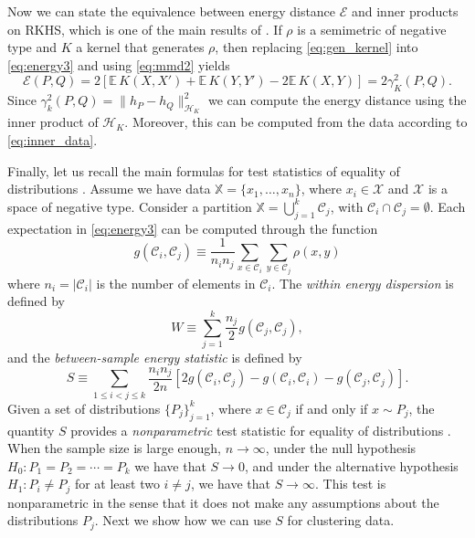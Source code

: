 \documentclass[aps,preprint,nofootinbib,floatfix]{revtex4-1}
\newcommand\Energy{\mathcal{E}}
\newcommand\E{\mathbb{E}}
\newcommand\kk{K}
\newcommand\kkk{h}
\newcommand\Hk{{\mathcal{H}}_{\kk}}
\newcommand\C{{\mathcal{C}}}
\begin{document}
Now we can state the equivalence between energy distance $\Energy$ and
inner products on RKHS, which is one of the main results of
\cite{Sejdinovic2013}. If $\rho$ is a semimetric
of negative type and $\kk$ a kernel that generates $\rho$, then
replacing \eqref{eq:gen_kernel} into
\eqref{eq:energy3} and using \eqref{eq:mmd2} yields
\begin{equation} \label{eq:Erho}
\Energy(P, Q) = 
2 \left[ \E \, \kk(X, X') + \E \, \kk(Y, Y') - 2\E \, \kk(X, Y)\right] 
= 2 \gamma_\kk^2(P,Q) .
\end{equation}
Since $\gamma_k^2(P, Q) = \| \kkk_P - \kkk_Q \|^2_{\Hk}$ we
can compute the energy distance using the inner product of $\Hk$. Moreover,
this can be computed from the data according to \eqref{eq:inner_data}.

Finally, let us recall the main formulas for test statistics
of equality of distributions \cite{Szkely2013}. 
Assume we have data $\mathbb{X} = \{ x_1,\dotsc, x_n \}$, where
$x_i \in \mathcal{X}$ and $\mathcal{X}$ is a space of negative type.
Consider a partition $\mathbb{X} = \bigcup_{j=1}^k \C_j$, with
$\C_i \cap \C_j = \emptyset$.
Each expectation in 
\eqref{eq:energy3}
can be computed 
through the function
\begin{equation}
\label{eq:g_def}
g (\C_i, \C_j) \equiv 
\dfrac{1}{n_i n_j}
\sum_{x \in \C_i} 
\sum_{y \in \C_j} \rho(x, y)
\end{equation}
where $n_i = |\C_i|$ is the number of elements in 
$\C_i$. 
The \emph{within energy dispersion} is defined by
\begin{equation}
\label{eq:within}
W \equiv
\sum_{j=1}^{k} \dfrac{n_j}{2} g(\C_j, \C_j),
\end{equation}
and the \emph{between-sample energy statistic} is defined by
\begin{equation}
\label{eq:between}
S \equiv
\sum_{1 \le  i < j \le k } \dfrac{n_i n_{j}}{2 n} \left[
2 g(\C_i, \C_j) - 
g(\C_i, \C_i) - 
g(\C_j, \C_j)
\right].
\end{equation}
Given a set of distributions
$\{ P_j\}_{j=1}^k$, where $x \in \C_j$ if and only if $x \sim P_j$, 
the quantity $S$ provides
a \emph{nonparametric} test statistic for equality of distributions
\cite{Szkely2013}.
When the sample size is large enough, $n\to \infty$,
under the null hypothesis $H_0: P_1=P_2=\dotsm=P_k$ we have that
$S\to 0$, 
and under
the alternative hypothesis $H_1: P_i \ne P_j$ for at least two $i\ne j$, 
we have that $S \to \infty$.
This test is nonparametric in the sense that it does not make any assumptions
about the distributions $P_j$. Next we show how we can use $S$ for clustering
data.
\end{document}
